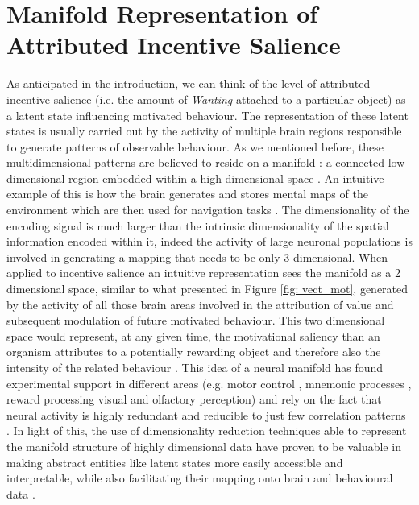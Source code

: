 \section{Manifold Representation of Attributed Incentive Salience}
As anticipated in the introduction, we can think of the level of attributed incentive salience (i.e. the amount of \textit{Wanting} attached to a particular object) as a latent state influencing motivated behaviour. The representation of these latent states is usually carried out by the activity of multiple brain regions responsible to generate patterns of observable behaviour. As we mentioned before, these multidimensional patterns are believed to reside on a manifold \cite{seung2000manifold, pang2016dimensionality}: a connected low dimensional region embedded within a high dimensional space \cite{bengio2017deep}. An intuitive example of this is how the brain generates and stores mental maps of the environment which are then used for navigation tasks \cite{derdikman2011manifold, nieh2021geometry}. The dimensionality of the encoding signal is much larger than the intrinsic dimensionality of the spatial information encoded within it, indeed the activity of large neuronal populations is involved in generating a mapping that needs to be only 3 dimensional. When applied to incentive salience an intuitive representation sees the manifold as a 2 dimensional space, similar to what presented in Figure \ref{fig: vect_mot}, generated by the activity of all those brain areas involved in the attribution of value and subsequent modulation of future motivated behaviour. This two dimensional space would represent, at any given time, the motivational saliency than an organism attributes to a potentially rewarding object and therefore also the intensity of the related  behaviour \cite{berridge1998role, simpson2016behavioral}. This idea of a neural manifold has found experimental support in different areas (e.g. motor control \cite{gallego2017neural}, mnemonic processes \cite{derdikman2011manifold, nieh2021geometry}, reward processing \cite{bromberg2010coding} visual \cite{seung2000manifold, ganmor2015thesaurus} and olfactory \cite{stopfer2003intensity} perception) and rely on the fact that neural activity is highly redundant and reducible to just few correlation patterns \cite{gallego2017neural}. In light of this, the use of dimensionality reduction techniques able to represent the manifold structure of highly dimensional data have proven to be valuable in making abstract entities like latent states more easily accessible and interpretable, while also facilitating their mapping onto brain \cite{gao2021nonlinear, rue2021decoding} and behavioural data \cite{luxem2020identifying, pereira2020quantifying, mccullough2021unsupervised, shi2021learning}.


